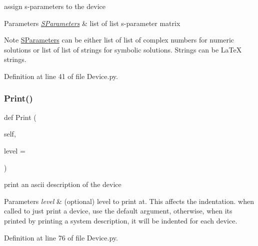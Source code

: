 assign s-\/parameters to the device 


\begin{DoxyParams}{Parameters}
{\em \hyperlink{namespaceSignalIntegrity_1_1SParameters}{S\+Parameters}} & list of list s-\/parameter matrix \\
\hline
\end{DoxyParams}
\begin{DoxyNote}{Note}
\hyperlink{namespaceSignalIntegrity_1_1SParameters}{S\+Parameters} can be either list of list of complex numbers for numeric solutions or list of list of strings for symbolic solutions. Strings can be La\+TeX strings. 
\end{DoxyNote}


Definition at line 41 of file Device.\+py.

\mbox{\label{classSignalIntegrity_1_1SystemDescriptions_1_1Device_1_1Device_a891ce4dff358dfe4f73c3c0e269bcffd}} 
\subsubsection{\texorpdfstring{Print()}{Print()}}
{\footnotesize\ttfamily def Print (\begin{DoxyParamCaption}\item[{}]{self,  }\item[{}]{level = {} }\end{DoxyParamCaption})}



print an ascii description of the device 


\begin{DoxyParams}{Parameters}
{\em level} & (optional) level to print at. This affects the indentation. when called to just print a device, use the default argument, otherwise, when it\textquotesingle{}s printed by printing a system description, it will be indented for each device. \\
\hline
\end{DoxyParams}


Definition at line 76 of file Device.\+py.

